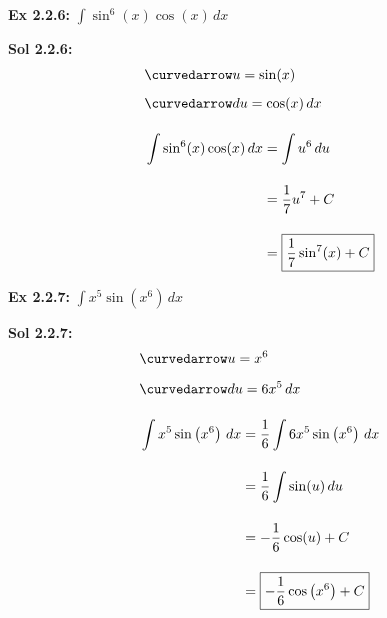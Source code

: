 \begin{tcolorbox}[example]
    \textbf{Ex 2.2.6: } $\int \sin^6 (x)\cos (x) \, dx$
\end{tcolorbox}
\begin{tcolorbox}[solution]
    \textbf{Sol 2.2.6: }\begin{align*}
        & \curvedarrow u = \sin (x) \\[5.5pt]
        & \curvedarrow du = \cos (x) \, dx \\[11pt]
        & \int \sin^6 (x)\cos (x) \, dx \begin{aligned}[t]
            & = \int u^6 \, du \\[11pt]
            & = \dfrac{1}{7}u^7 + C \\[11pt]
            & = \boxed{\dfrac{1}{7}\sin^7 (x) + C}
        \end{aligned}
    \end{align*}
\end{tcolorbox} \vspace{11pt}

\begin{tcolorbox}[example]
    \textbf{Ex 2.2.7: } $\int x^5\sin \left(x^6\right) \, dx$ 
\end{tcolorbox}
\begin{tcolorbox}[solution]
    \textbf{Sol 2.2.7: } \begin{align*}
        & \curvedarrow u = x^6 \\[5.5pt]
        & \curvedarrow du = 6x^5 \, dx \\[11pt]
        & \int x^5\sin \left(x^6\right) \, dx \begin{aligned}[t]
            & = \dfrac{1}{6}\int 6x^5\sin \left(x^6\right) \, dx \\[11pt]
            & = \dfrac{1}{6}\int \sin (u) \, du \\[11pt]
            & = -\dfrac{1}{6}\cos (u) + C \\[11pt]
            & = \boxed{-\dfrac{1}{6}\cos \left(x^6\right) + C}
        \end{aligned}
    \end{align*}
\end{tcolorbox} \vspace{11pt}

